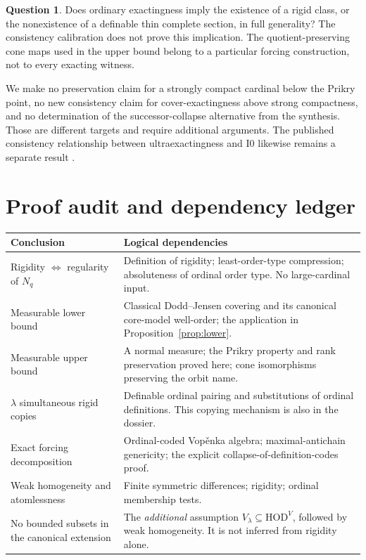 \documentclass[11pt,letterpaper]{article}
\theoremstyle{definition}
\newtheorem{question}[definition]{Question}
\numberwithin{equation}{section}
\newcommand{\HOD}{\mathrm{HOD}}
\newcommand{\Izero}{\mathrm{I0}}
\begin{document}
\begin{question}
Does ordinary exactingness imply the existence of a rigid class, or the
nonexistence of a definable thin complete section, in full generality?
The consistency calibration does not prove this implication. The
quotient-preserving cone maps used in the upper bound belong to a
particular forcing construction, not to every exacting witness.
\end{question}

We make no preservation claim for a strongly compact cardinal below the
Prikry point, no new consistency claim for cover-exactingness above strong
compactness, and no determination of the successor-collapse alternative
from the synthesis. Those are different targets and require additional
arguments. The published consistency relationship between ultraexactingness
and $\Izero$ likewise remains a separate result \cite{ABGL}.

\section{Proof audit and dependency ledger}\label{sec:audit}

\begin{center}
\small
\begin{tabularx}{\textwidth}{@{}P{.28\textwidth}Y@{}}
\toprule
Conclusion & Logical dependencies\\
\midrule
Rigidity $\Leftrightarrow$ regularity of $N_q$ & Definition of rigidity; least-order-type compression; absoluteness of ordinal order type. No large-cardinal input.\\
Measurable lower bound & Classical Dodd--Jensen covering and its canonical core-model well-order; the application in Proposition~\ref{prop:lower}.\\
Measurable upper bound & A normal measure; the Prikry property and rank preservation proved here; cone isomorphisms preserving the orbit name.\\
$\lambda$ simultaneous rigid copies & Definable ordinal pairing and substitutions of ordinal definitions. This copying mechanism is also in the dossier.\\
Exact forcing decomposition & Ordinal-coded Vop\v enka algebra; maximal-antichain genericity; the explicit collapse-of-definition-codes proof.\\
Weak homogeneity and atomlessness & Finite symmetric differences; rigidity; ordinal membership tests.\\
No bounded subsets in the canonical extension & The \emph{additional} assumption $V_\lambda\subseteq\HOD^V$, followed by weak homogeneity. It is not inferred from rigidity alone.\\
\bottomrule
\end{tabularx}
\end{center}
\end{document}

